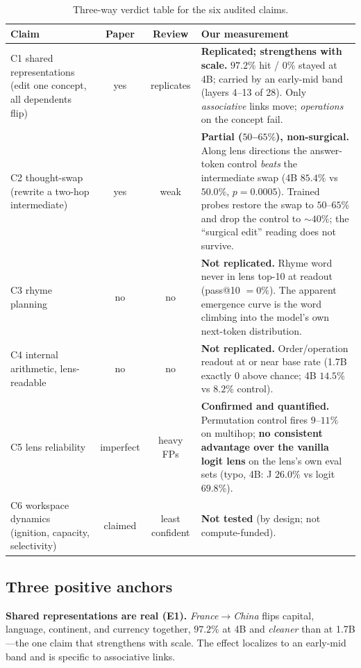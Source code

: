 \documentclass[11pt]{article}
\newcommand{\pct}{\%}
\begin{document}
\begin{table}[h]
\centering
\small
\renewcommand{\arraystretch}{1.25}
\begin{tabularx}{\textwidth}{@{}l c c Y@{}}
\toprule
\textbf{Claim} & \textbf{Paper} & \textbf{Review} & \textbf{Our measurement} \\
\midrule
C1 shared representations (edit one concept, all dependents flip)
& yes & replicates
& \textbf{Replicated; strengthens with scale.} $97.2\pct$ hit / $0\pct$ stayed at
4B; carried by an early-mid band (layers 4--13 of 28). Only \emph{associative}
links move; \emph{operations} on the concept fail. \\
C2 thought-swap (rewrite a two-hop intermediate)
& yes & weak
& \textbf{Partial ($50$--$65\pct$), non-surgical.} Along lens directions the
answer-token control \emph{beats} the intermediate swap (4B $85.4\pct$ vs
$50.0\pct$, $p{=}0.0005$). Trained probes restore the swap to $50$--$65\pct$ and
drop the control to $\sim40\pct$; the ``surgical edit'' reading does not survive. \\
C3 rhyme planning
& no & no
& \textbf{Not replicated.} Rhyme word never in lens top-10 at readout
(pass@10 $=0\pct$). The apparent emergence curve is the word climbing into the
model's own next-token distribution. \\
C4 internal arithmetic, lens-readable
& no & no
& \textbf{Not replicated.} Order/operation readout at or near base rate (1.7B
exactly $0$ above chance; 4B $14.5\pct$ vs $8.2\pct$ control). \\
C5 lens reliability
& imperfect & heavy FPs
& \textbf{Confirmed and quantified.} Permutation control fires $9$--$11\pct$ on
multihop; \textbf{no consistent advantage over the vanilla logit lens} on the
lens's own eval sets (typo, 4B: J $26.0\pct$ vs logit $69.8\pct$). \\
C6 workspace dynamics (ignition, capacity, selectivity)
& claimed & least confident
& \textbf{Not tested} (by design; not compute-funded). \\
\bottomrule
\end{tabularx}
\caption{Three-way verdict table for the six audited claims.}
\label{tab:verdict}
\end{table}

\subsection{Three positive anchors}

\textbf{Shared representations are real (E1).} \emph{France}$\to$\emph{China}
flips capital, language, continent, and currency together, $97.2\pct$ at 4B and
\emph{cleaner} than at 1.7B---the one claim that strengthens with scale. The
effect localizes to an early-mid band and is specific to associative links.
\end{document}
